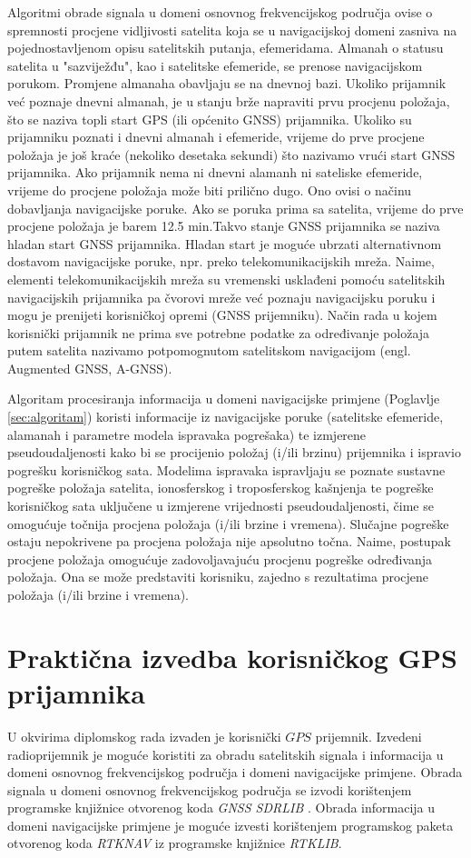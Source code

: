 \documentclass[a4paper,twoside,12pt]{memoir} %
\begin{document}
Algoritmi obrade signala u domeni osnovnog frekvencijskog područja ovise o spremnosti procjene vidljivosti satelita koja se u navigacijskoj domeni zasniva na pojednostavljenom
opisu satelitskih putanja, efemeridama. Almanah o statusu satelita u "sazviježđu", kao i satelitske efemeride, se prenose navigacijskom porukom. Promjene almanaha obavljaju se na
dnevnoj bazi. Ukoliko prijamnik već poznaje dnevni almanah, je u stanju brže napraviti
prvu procjenu položaja, što se naziva topli start GPS (ili općenito GNSS) prijamnika.
Ukoliko su prijamniku poznati i dnevni almanah i efemeride, vrijeme do prve procjene položaja je još kraće (nekoliko desetaka sekundi) što nazivamo vrući start GNSS prijamnika. Ako
prijamnik nema ni dnevni alamanh ni sateliske efemeride, vrijeme do procjene položaja
može biti prilično dugo. Ono ovisi o načinu dobavljanja navigacijske poruke. Ako se poruka
prima sa satelita, vrijeme do prve procjene položaja je barem 12.5 min.Takvo stanje GNSS prijamnika se naziva hladan start GNSS prijamnika. Hladan start je moguće ubrzati alternativnom dostavom navigacijske poruke, npr. preko
telekomunikacijskih mreža. Naime, elementi telekomunikacijskih mreža su vremenski usklađeni pomoću satelitskih
navigacijskih prijamnika pa čvorovi mreže već poznaju navigacijsku poruku i mogu je prenijeti
korisničkoj opremi (GNSS prijemniku). Način rada u kojem
korisnički prijamnik ne prima sve potrebne podatke za određivanje položaja putem satelita nazivamo potpomognutom satelitskom navigacijom (engl. Augmented GNSS, A-GNSS).

Algoritam procesiranja informacija u domeni navigacijske primjene (Poglavlje \ref{sec:algoritam}) koristi informacije iz
navigacijske poruke (satelitske efemeride, alamanah i parametre modela ispravaka pogrešaka) te
izmjerene pseudoudaljenosti kako bi se procijenio položaj (i/ili brzinu) prijemnika i ispravio
pogrešku korisničkog sata. Modelima ispravaka ispravljaju se poznate sustavne pogreške
položaja satelita, ionosferskog i troposferskog kašnjenja te pogreške korisničkog sata uključene u
izmjerene vrijednosti pseudoudaljenosti, čime se omogućuje točnija procjena
položaja (i/ili brzine i vremena). Slučajne pogreške ostaju nepokrivene pa procjena položaja nije
apsolutno točna. Naime, postupak procjene položaja omogućuje zadovoljavajuću procjenu pogreške
određivanja položaja. Ona se može predstaviti korisniku, zajedno s rezultatima procjene položaja (i/ili brzine i vremena).

\section{Praktična izvedba korisničkog GPS prijamnika}
U okvirima diplomskog rada izvaden je korisnički $GPS$ prijemnik.
Izvedeni radioprijemnik je moguće koristiti za obradu satelitskih signala i informacija u domeni osnovnog frekvencijskog područja i domeni navigacijske primjene. Obrada signala u domeni osnovnog frekvencijskog područja se izvodi korištenjem programske knjižnice otvorenog koda \textit{GNSS SDRLIB}
\cite{ref:48}. Obrada informacija u domeni navigacijske primjene je moguće izvesti korištenjem programskog paketa otvorenog koda \textit{RTKNAV} iz programske knjižnice \textit{RTKLIB}\cite{ref:36}.
\end{document}
